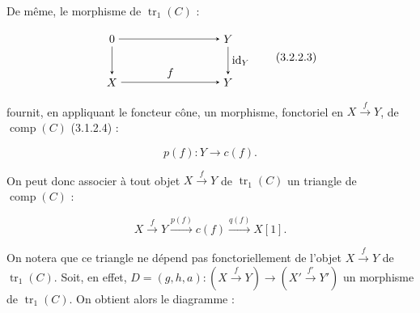 \clearpage
{}%
De même, le morphisme de $\operatorname{tr}_1(C)$ :

\begin{equation}
  \begin{tikzpicture}[>=stealth,baseline=(current bounding box.center)]
    \node (Z)  at (0,1.35) {$0$};
    \node (Y)  at (3.6,1.35) {$Y$};
    \node (X)  at (0,0) {$X$};
    \node (Yp) at (3.6,0) {$Y$};
    \draw[->] (Z) -- (Y);
    \draw[->] (Z) -- (X);
    \draw[->] (Y) -- node[right] {$\operatorname{id}_Y$} (Yp);
    \draw[->] (X) -- node[above] {$f$} (Yp);
  \end{tikzpicture}
  \tag{3.2.2.3}
\end{equation}

fournit, en appliquant le foncteur cône, un morphisme, fonctoriel en
$X\xrightarrow{f}Y$, de $\operatorname{comp}(C)$ (3.1.2.4) :

\begin{equation}
  p(f)\colon Y\longrightarrow c(f).
  \tag{3.2.2.4}
\end{equation}

On peut donc associer à tout objet $X\xrightarrow{f}Y$ de
$\operatorname{tr}_1(C)$ un triangle de $\operatorname{comp}(C)$ :

\begin{equation}
  X\xrightarrow{f}Y\xrightarrow{p(f)}c(f)\xrightarrow{q(f)}X[1].
  \tag{3.2.2.5}
\end{equation}

On notera que ce triangle ne dépend pas fonctoriellement de l'objet
$X\xrightarrow{f}Y$ de $\operatorname{tr}_1(C)$.
Soit, en effet,
$D=(g,h,a)\colon(X\xrightarrow{f}Y)\longrightarrow
(X'\xrightarrow{f'}Y')$
un morphisme de $\operatorname{tr}_1(C)$. On obtient alors le diagramme :

